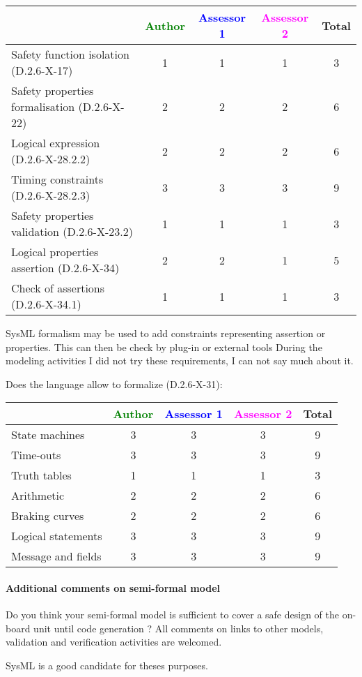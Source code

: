 \begin{tabular}{|l | c | c | c | c|}
\hline
& \textcolor{green}{Author} & \textcolor{blue}{Assessor 1} & \textcolor{magenta}{Assessor 2} & Total \\
\hline 
Safety function isolation (D.2.6-X-17)  & 1& 1& 1 & 3 \\
\hline 
Safety properties formalisation (D.2.6-X-22)  &2 & 2& 2  & 6 \\
\hline
Logical expression (D.2.6-X-28.2.2)  &2 & 2& 2& 6 \\
\hline
Timing constraints (D.2.6-X-28.2.3)  &3 & 3 & 3& 9 \\
\hline
Safety properties validation (D.2.6-X-23.2)  &1 & 1& 1& 3 \\
\hline
Logical properties assertion (D.2.6-X-34)  &2 & 2& 1 & 5 \\
\hline
Check  of assertions (D.2.6-X-34.1)  &1 & 1& 1 & 3  \\
\hline
\end{tabular}
\begin{author_comment}
SysML formalism may be used to add constraints representing assertion
or properties. This can then be check by plug-in or external tools
During the modeling activities I did not try these requirements, I can
not say much about it.
\end{author_comment}
Does the language allow to  formalize (D.2.6-X-31):

\begin{tabular}{|l | c | c | c | c|}
\hline
& \textcolor{green}{Author} & \textcolor{blue}{Assessor 1} & \textcolor{magenta}{Assessor 2} & Total \\
\hline 
State machines  &3 & 3& 3& 9 \\
\hline
Time-outs  &3 & 3& 3& 9 \\
\hline
Truth tables  &1 &1 & 1& 3  \\
\hline
Arithmetic  &2 & 2& 2& 6 \\
\hline
Braking curves  &2 & 2& 2& 6  \\
\hline
Logical statements &3 & 3& 3& 9  \\
\hline
Message and fields &3 & 3&3 & 9  \\
\hline
\end{tabular}

\paragraph{Additional comments on semi-formal  model} Do you think your semi-formal  model is sufficient to cover a safe design of the on-board unit until code generation ?
All comments on links to  other models, validation and verification activities are welcomed.
\begin{author_comment}
SysML \cite{sysmlbook} is a good candidate for theses purposes.
\end{author_comment}
